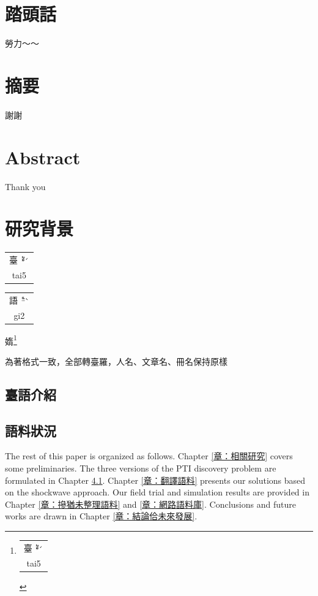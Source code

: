 \documentclass[final,oneside,onecolumn,12pt,a4paper]{book}%
\makeatletter
\newcommand{\rubybot}[2]{%
  \@tempdimc \f@size\p@
  \begin{tabular}[t]{@{}c@{}}
    #1\\[-3em]
    \fontsize{.8\@tempdimc}{.8\@tempdimc}\selectfont%
    \setlength{\normalbaselineskip}{0pt}#2 
  \end{tabular}%
}
\makeatother
\begin{document}
\frontmatter
\chapter{踏頭話}
勞力～～
\newpage

\chapter{摘要}
謝謝

\newpage

\chapter{Abstract}

Thank you

\newpage

\tableofcontents
\listoffigures
\listoftables



\mainmatter


\chapter{研究背景}
\label{章：研究背景}

\rubybot{臺 \includegraphics[height=1em]{圖/⿳⿳ㄉㄞˊ}}{tai5}
\rubybot{語 \includegraphics[height=1em]{圖/⿳⿳ㆣㄧˋ}}{gi2}
媠\footnote{\rubybot{臺 \includegraphics[height=1em]{圖/⿳⿳ㄉㄞˊ}}{tai5}}

為著格式一致，全部轉臺羅，人名、文章名、冊名保持原樣

\section{臺語介紹}
\label{章：臺語介紹}

\section{語料狀況}
\label{節：語料狀況}

The rest of this paper is organized as follows. Chapter
\ref{章：相關研究} covers some preliminaries.
The three versions of the PTI discovery problem are formulated in Chapter
\ref{章：臺語介紹}. Chapter \ref{章：翻譯語料} presents our
solutions based on the shockwave approach. Our field trial and simulation
results are provided in Chapter \ref{章：摻猶未整理語料} and
\ref{章：網路語料庫}. Conclusions and future works are drawn in Chapter
\ref{章：結論佮未來發展}.
\end{document}
